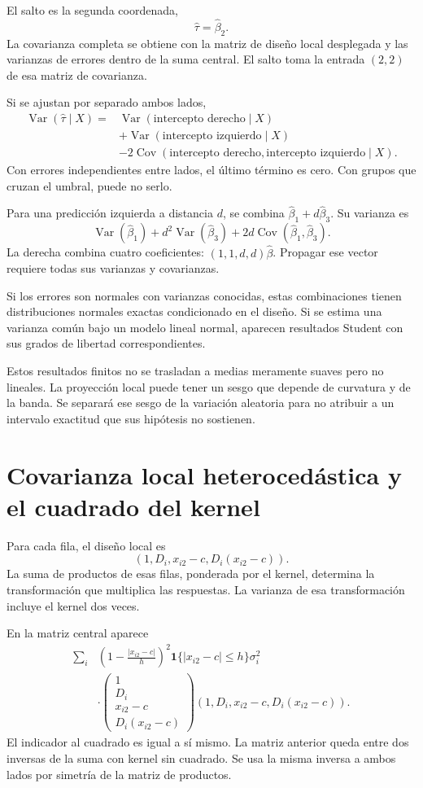 \documentclass[11pt,a4paper]{article}
\DeclareMathOperator{\Var}{Var}
\DeclareMathOperator{\Cov}{Cov}
\begin{document}
El salto es la segunda coordenada,
\[
\widehat\tau=\widehat\beta_2.
\]
La covarianza completa se obtiene
con la matriz de diseño local desplegada
y las varianzas de errores dentro de la suma central.
El salto toma la entrada \((2,2)\)
de esa matriz de covarianza.

Si se ajustan por separado ambos lados,
\[
\begin{aligned}
\Var(\widehat\tau\mid X)
={}&\Var(\text{intercepto derecho}\mid X)\\
&+\Var(\text{intercepto izquierdo}\mid X)\\
&-2\Cov(\text{intercepto derecho},
\text{intercepto izquierdo}\mid X).
\end{aligned}
\]
Con errores independientes entre lados,
el último término es cero.
Con grupos que cruzan el umbral,
puede no serlo.

Para una predicción izquierda a distancia \(d\),
se combina \(\widehat\beta_1+d\widehat\beta_3\).
Su varianza es
\[
\Var(\widehat\beta_1)+d^2\Var(\widehat\beta_3)
+2d\Cov(\widehat\beta_1,\widehat\beta_3).
\]
La derecha combina cuatro coeficientes:
\((1,1,d,d)\widehat\beta\).
Propagar ese vector requiere todas
sus varianzas y covarianzas.

Si los errores son normales con varianzas conocidas,
estas combinaciones tienen distribuciones
normales exactas condicionado en el diseño.
Si se estima una varianza común bajo
un modelo lineal normal, aparecen resultados
Student con sus grados de libertad correspondientes.

Estos resultados finitos no se trasladan
a medias meramente suaves pero no lineales.
La proyección local puede tener un sesgo
que depende de curvatura y de la banda.
Se separará ese sesgo de la variación aleatoria
para no atribuir a un intervalo exactitud
que sus hipótesis no sostienen.

\clearpage
\section{Covarianza local heterocedástica y el cuadrado del kernel}\label{unidad29}
Para cada fila, el diseño local es
\[
(1,D_i,x_{i2}-c,D_i(x_{i2}-c)).
\]
La suma de productos de esas filas,
ponderada por el kernel, determina la
transformación que multiplica las respuestas.
La varianza de esa transformación incluye
el kernel dos veces.

En la matriz central aparece
\[
\begin{aligned}
\sum_i&
\left(1-\frac{|x_{i2}-c|}{h}\right)^2
\mathbf1\{|x_{i2}-c|\le h\}\sigma_i^2\\
&\cdot
\begin{pmatrix}1\\D_i\\x_{i2}-c\\D_i(x_{i2}-c)\end{pmatrix}
(1,D_i,x_{i2}-c,D_i(x_{i2}-c)).
\end{aligned}
\]
El indicador al cuadrado es igual a sí mismo.
La matriz anterior queda entre dos
inversas de la suma con kernel sin cuadrado.
Se usa la misma inversa a ambos lados
por simetría de la matriz de productos.
\end{document}
